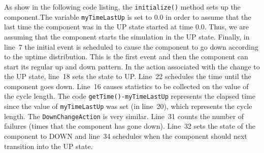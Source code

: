 \documentclass[
]{book}
\theoremstyle{definition}
\theoremstyle{definition}
\theoremstyle{definition}
\theoremstyle{definition}
\theoremstyle{remark}
\begin{document}
As show in the following code listing, the \texttt{initialize()} method sets up the component.The variable \texttt{myTimeLastUp} is set to 0.0 in order to assume that the last time the component was in the UP state started at time 0.0. Thus,
we are assuming that the component starts the simulation in the UP
state. Finally, in line~7 the initial event is scheduled to cause the
component to go down according to the uptime distribution. This is the
first event and then the component can start its regular up and down
pattern. In the action associated with the change to the UP state,
line~18 sets the state to UP. Line~22 schedules the time until the
component goes down. Line~16 causes statistics to be collected on the
value of the cycle length. The code \texttt{getTime()-myTimeLastUp} represents
the elapsed time since the value of \texttt{myTimeLastUp} was set (in line~20),
which represents the cycle length. The \texttt{DownChangeAction} is very similar.
Line~31 counts the number of failures (times that the component has gone
down). Line~32 sets the state of the component to DOWN and line~34
schedules when the component should next transition into the UP state.
\end{document}
